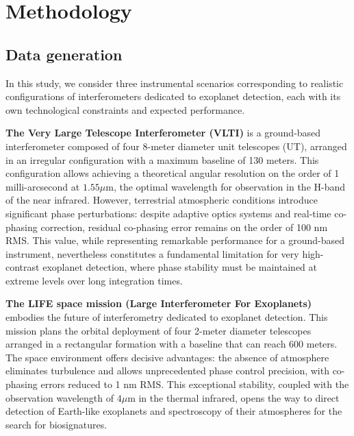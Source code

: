 \documentclass{article}
\begin{document}
\section{Methodology}



\subsection{Data generation}

In this study, we consider three instrumental scenarios corresponding to realistic configurations of interferometers dedicated to exoplanet detection, each with its own technological constraints and expected performance.

\textbf{The Very Large Telescope Interferometer (VLTI)} is a ground-based interferometer composed of four 8-meter diameter unit telescopes (UT), arranged in an irregular configuration with a maximum baseline of 130 meters. This configuration allows achieving a theoretical angular resolution on the order of 1 milli-arcsecond at $1.55\mu$m, the optimal wavelength for observation in the H-band of the near infrared. However, terrestrial atmospheric conditions introduce significant phase perturbations: despite adaptive optics systems and real-time co-phasing correction, residual co-phasing error remains on the order of 100 nm RMS. This value, while representing remarkable performance for a ground-based instrument, nevertheless constitutes a fundamental limitation for very high-contrast exoplanet detection, where phase stability must be maintained at extreme levels over long integration times.

\textbf{The LIFE space mission (Large Interferometer For Exoplanets)} embodies the future of interferometry dedicated to exoplanet detection. This mission plans the orbital deployment of four 2-meter diameter telescopes arranged in a rectangular formation with a baseline that can reach 600 meters. The space environment offers decisive advantages: the absence of atmosphere eliminates turbulence and allows unprecedented phase control precision, with co-phasing errors reduced to 1 nm RMS. This exceptional stability, coupled with the observation wavelength of $4\mu$m in the thermal infrared, opens the way to direct detection of Earth-like exoplanets and spectroscopy of their atmospheres for the search for biosignatures.
\end{document}
